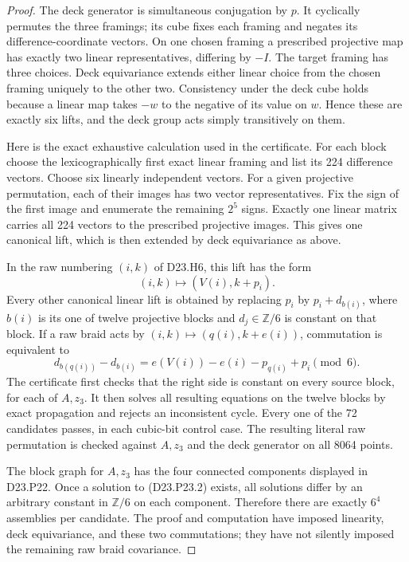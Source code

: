 \begin{proof}
The deck generator is simultaneous conjugation by $p$.
It cyclically permutes the three framings; its cube fixes
each framing and negates its difference-coordinate vectors.
On one chosen framing a prescribed projective map has
exactly two linear representatives, differing by $-I$.
The target framing has three choices. Deck equivariance
extends either linear choice from the chosen framing
uniquely to the other two. Consistency under the deck cube
holds because a linear map takes $-w$ to the negative of
its value on $w$. Hence these are exactly six lifts, and
the deck group acts simply transitively on them.

Here is the exact exhaustive calculation used in the
certificate. For each block choose the lexicographically
first exact linear framing and list its 224 difference
vectors. Choose six linearly independent vectors. For a
given projective permutation, each of their images has
two vector representatives. Fix the sign of the first
image and enumerate the remaining $2^5$ signs. Exactly
one linear matrix carries all 224 vectors to the prescribed
projective images. This gives one canonical lift, which
is then extended by deck equivariance as above.

In the raw numbering $(i,k)$ of D23.H6, this lift has
the form
\[
                  (i,k)\longmapsto(V(i),k+p_i).
\]
Every other canonical linear lift is obtained by replacing
$p_i$ by $p_i+d_{b(i)}$, where $b(i)$ is its one of twelve
projective blocks and $d_j\in\mathbb Z/6$ is constant
on that block. If a raw braid acts by
$(i,k)\mapsto(q(i),k+e(i))$, commutation is equivalent to
\[
 d_{b(q(i))}-d_{b(i)}
        =e(V(i))-e(i)-p_{q(i)}+p_i\pmod6.                 \tag{D23.P23.2}
\]
The certificate first checks that the right side is
constant on every source block, for each of $A,z_3$.
It then solves all resulting equations on the twelve
blocks by exact propagation and rejects an inconsistent
cycle. Every one of the 72 candidates passes, in each
cubic-bit control case. The resulting literal raw
permutation is checked against $A,z_3$ and the deck
generator on all 8064 points.

The block graph for $A,z_3$ has the four connected
components displayed in D23.P22. Once a solution to
(D23.P23.2) exists, all solutions differ by an arbitrary
constant in $\mathbb Z/6$ on each component. Therefore
there are exactly $6^4$ assemblies per candidate. The
proof and computation have imposed linearity, deck
equivariance, and these two commutations; they have not
silently imposed the remaining raw braid covariance.
\end{proof}

